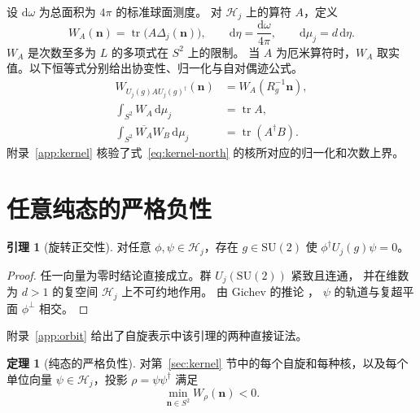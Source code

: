 \documentclass[UTF8,11pt,a4paper]{ctexart}
\theoremstyle{definition}
\newtheorem{theorem}{定理}
\newtheorem{lemma}{引理}
\DeclareMathOperator{\tr}{tr}
\newcommand{\SU}{\mathrm{SU}}
\newcommand{\dd}{\,\mathrm{d}}
\newcommand{\vn}{\mathbf n}
\begin{document}
设 \(\mathrm d\omega\) 为总面积为 \(4\pi\) 的标准球面测度。
对 \(\mathcal H_j\) 上的算符 \(A\)，定义
\begin{equation}
  W_A(\vn)=\tr\bigl(A\Delta_j(\vn)\bigr),\qquad
  \mathrm d\eta=\frac{\mathrm d\omega}{4\pi},\qquad
  \mathrm d\mu_j=d\,\mathrm d\eta .
  \label{eq:measure}
\end{equation}
\(W_A\) 是次数至多为 \(L\) 的多项式在 \(S^2\) 上的限制。
当 \(A\) 为厄米算符时，\(W_A\) 取实值。以下恒等式分别给出协变性、归一化与自对偶迹公式。
\begin{subequations}\label{eq:identities}
\begin{align}
  W_{U_j(g)AU_j(g)^\dagger}(\vn)&=W_A(R_g^{-1}\vn),
    \label{eq:symbol-covariance}\\
  \int_{S^2} W_A\dd\mu_j&=\tr A,
    \label{eq:trace-normalization}\\
  \int_{S^2}\overline{W_A}W_B\dd\mu_j&=\tr(A^\dagger B).
    \label{eq:traciality}
\end{align}
\end{subequations}
附录~\ref{app:kernel} 核验了式~\eqref{eq:kernel-north} 的核所对应的归一化和次数上界。

\section{任意纯态的严格负性}

\begin{lemma}[旋转正交性]\label{lem:orbit}
对任意 \(\phi,\psi\in\mathcal H_j\)，存在 \(g\in\SU(2)\) 使
\(\phi^\dagger U_j(g)\psi=0\)。
\end{lemma}

\begin{proof}
任一向量为零时结论直接成立。群 \(U_j(\SU(2))\) 紧致且连通，
并在维数为 \(d>1\) 的复空间 \(\mathcal H_j\) 上不可约地作用。
由 Gichev 的推论 \cite[推论 1]{gichev2004}，
\(\psi\) 的轨道与复超平面 \(\phi^\perp\) 相交。
\end{proof}

附录~\ref{app:orbit} 给出了自旋表示中该引理的两种直接证法。

\begin{theorem}[纯态的严格负性]\label{thm:negative}
对第~\ref{sec:kernel} 节中的每个自旋和每种核，以及每个单位向量
\(\psi\in\mathcal H_j\)，投影 \(\rho=\psi\psi^\dagger\) 满足
\begin{equation}
  \min_{\vn\in S^2}W_\rho(\vn)<0 .
  \label{eq:negative}
\end{equation}
\end{theorem}
\end{document}
